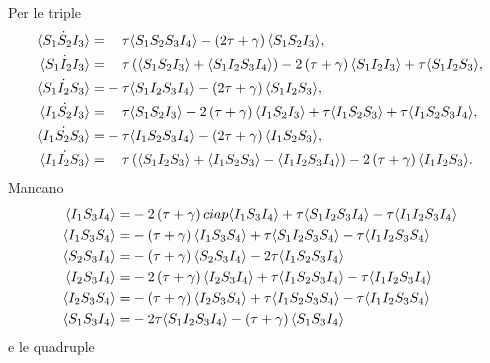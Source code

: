 \documentclass{report}
\begin{document}
Per le triple
 \begin{equation*}
 \begin{aligned}
 		\dot{\angol{S_1S_2I_3}}=&\spa \tau \angol{S_1S_2S_3I_4} -\tonde{ 2\tau + \gamma} \angol{S_1S_2I_3},\\
 		\dot{\angol{S_1I_2I_3}} =&\spa \tau \tonde{ \angol{S_1S_2I_3}+\angol{S_1I_2S_3I_4} } -2\tonde{ \tau + \gamma} \angol{S_1I_2I_3} + \tau \angol{S_1 I_2 S_3},\\
 		\dot{\angol{S_1I_2S_3}} =&-\tau \angol{S_1I_2S_3I_4} -\tonde{ 2\tau + \gamma} \angol{S_1I_2S_3},\\
 		\dot{\angol{I_1S_2I_3}} =&\spa \tau  \angol{S_1S_2I_3} -2\tonde{ \tau + \gamma} \angol{I_1S_2I_3} + \tau \angol{I_1S_2S_3}+\tau \angol{I_1S_2S_3I_4},\\
 		\dot{\angol{I_1S_2S_3}}=&-\tau \angol{ I_1S_2S_3I_4}-\tonde{ 2 \tau + \gamma} \angol{I_1S_2S_3},\\
 		\dot{\angol{I_1I_2S_3}} =&\spa\tau \tonde{ \angol{S_1I_2S_3}+ \angol{I_1S_2S_3} - \angol{I_1I_2S_3I_4}} -2\tonde{ \tau + \gamma} \angol{I_1I_2S_3}.
 	\end{aligned}
 \end{equation*}
 Mancano 
 \begin{equation*}
 	\begin{aligned}
 	\langle I_1S_3I_4 \rangle=&-2
 	\left(  \tau + \gamma \right) ciap\langle  I_1 S_3 I_4 \rangle + \tau \langle S_1I_2S_3I_4 \rangle-\tau \langle  I_1I_2S_3I_4 \rangle\\
 	\langle I_1S_3 S_4 \rangle =& - \left(  \tau + \gamma \right)  \langle I_1 S_3 S_4 \rangle + \tau\langle S_1I_2S_3S_4 \rangle -\tau \langle I_1I_2S_3S_4 \rangle\\
\langle S_2S_3I_4 \rangle=& 	-\left(  \tau + \gamma  \right) \langle S_2S_3I_4 \rangle  - 2\tau \langle  I_1S_2S_3I_4 \rangle \\
 	\langle I_2S_3I_4 \rangle= &-2\left(  \tau + \gamma \right)  	\langle I_2S_3I_4 \rangle + \tau \langle  I_1S_2S_3I_4 \rangle - \tau \langle  I_1I_2S_3 I_4 \rangle \\
 	\langle I_2S_3S_4 \rangle=&- \left(  \tau + \gamma \right)\langle  I_2 S_3S_4 \rangle +\tau \langle  I_1S_2S_3S_4 \rangle - \tau \langle  I_1I_2 S_3S_4 \rangle\\
 	\langle  S_1S_3I_4 \rangle =&- 2\tau \langle  S_1I_2S_3I_4 \rangle -\left(  \tau + \gamma \right) \langle  S_1S_3I_4 \rangle
 	\end{aligned}
 \end{equation*}
e le quadruple
\end{document}
